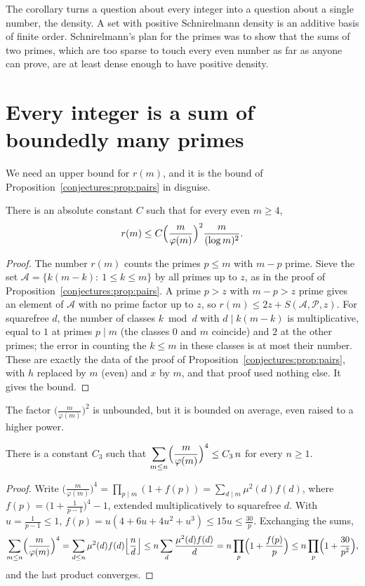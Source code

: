 The corollary turns a question about every integer into a question about a single number, the density. A set with positive Schnirelmann density is
an additive basis of finite order. Schnirelmann's plan for the primes was to show that the sums of two primes, which are too sparse to touch every
even number as far as anyone can prove, are at least dense enough to have positive density.

\section{Every integer is a sum of boundedly many primes}

We need an upper bound for $r(m)$, and it is the bound of Proposition~\ref{conjectures:prop:pairs} in disguise.

\begin{proposition}\label{conjectures:prop:goldbachsieve}
There is an absolute constant $C$ such that for every even $m\ge4$,
\[
r(m)\le C\Bigl(\frac m{\varphi(m)}\Bigr)^2\frac m{(\log m)^2}.
\]
\end{proposition}
\begin{proof}
The number $r(m)$ counts the primes $p\le m$ with $m-p$ prime. Sieve the set $\mathcal A=\{k(m-k):\ 1\le k\le m\}$ by all primes up to $z$, as in the
proof of Proposition~\ref{conjectures:prop:pairs}. A prime $p>z$ with $m-p>z$ prime gives an element of $\mathcal A$ with no prime factor up to $z$, so
$r(m)\le2z+S(\mathcal A,\mathcal P,z)$. For squarefree $d$, the number of classes $k\bmod d$ with $d\mid k(m-k)$ is multiplicative, equal to $1$ at
primes $p\mid m$ (the classes $0$ and $m$ coincide) and $2$ at the other primes; the error in counting the $k\le m$ in these classes is at most their
number. These are exactly the data of the proof of Proposition~\ref{conjectures:prop:pairs}, with $h$ replaced by $m$ (even) and $x$ by $m$, and that proof used
nothing else. It gives the bound.
\end{proof}

The factor $\bigl(\frac m{\varphi(m)}\bigr)^2$ is unbounded, but it is bounded on average, even raised to a higher power.

\begin{lemma}\label{conjectures:lem:phifour}
There is a constant $C_3$ such that $\displaystyle\sum_{m\le n}\Bigl(\frac m{\varphi(m)}\Bigr)^4\le C_3\,n$ for every $n\ge1$.
\end{lemma}
\begin{proof}
Write $\bigl(\frac m{\varphi(m)}\bigr)^4=\prod_{p\mid m}(1+f(p))=\sum_{d\mid m}\mu^2(d)f(d)$, where $f(p)=\bigl(1+\frac1{p-1}\bigr)^4-1$, extended
multiplicatively to squarefree $d$. With $u=\frac1{p-1}\le1$, $f(p)=u(4+6u+4u^2+u^3)\le15u\le\frac{30}p$. Exchanging the sums,
\[
\sum_{m\le n}\Bigl(\frac m{\varphi(m)}\Bigr)^4=\sum_{d\le n}\mu^2(d)f(d)\Bigl\lfloor\frac nd\Bigr\rfloor\le n\sum_d\frac{\mu^2(d)f(d)}d=n\prod_p\Bigl(1+\frac{f(p)}p\Bigr)\le n\prod_p\Bigl(1+\frac{30}{p^2}\Bigr),
\]
and the last product converges.
\end{proof}

